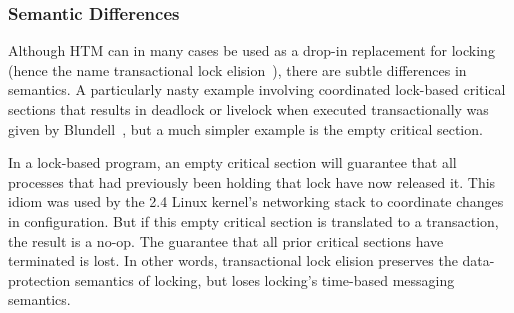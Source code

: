 \subsubsection{Semantic Differences}
\label{sec:future:Semantic Differences}

Although HTM can in many cases be used as a drop-in replacement for locking
(hence the name transactional lock
elision~\cite{DaveDice2008TransactLockElision}),
there are subtle differences in semantics.
A particularly nasty example involving coordinated lock-based critical
sections that results in deadlock or livelock when executed transactionally
was given by Blundell~\cite{Blundell2006TMdeadlock}, but a much simpler
example is the empty critical section.

In a lock-based program, an empty critical section will guarantee
that all processes that had previously been holding that lock have
now released it.
This idiom was used by the 2.4 Linux kernel's networking stack to
coordinate changes in configuration.
But if this empty critical section is translated to a transaction,
the result is a no-op.
The guarantee that all prior critical sections have terminated is
lost.
In other words, transactional lock elision preserves the data-protection
semantics of locking, but loses locking's time-based messaging semantics.


